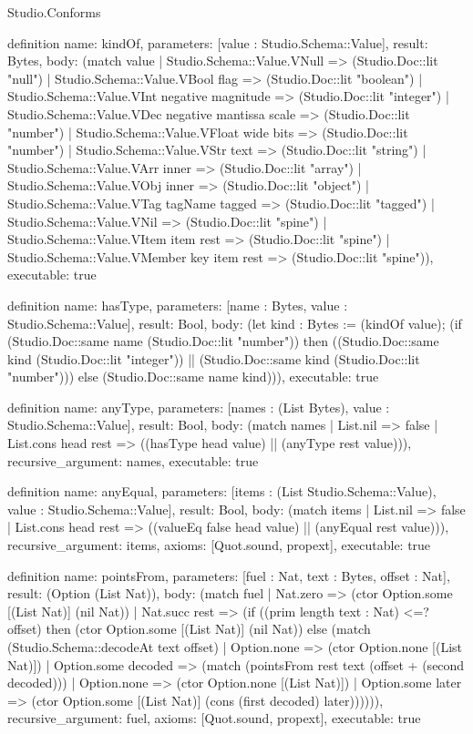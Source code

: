 \begin{lexlean}{Studio.Conforms}
\begin{semanticmodule}
definition{
  name: kindOf,
  parameters: [value : Studio.Schema::Value],
  result: Bytes,
  body: (match value
    | Studio.Schema::Value.VNull => (Studio.Doc::lit "null")
    | Studio.Schema::Value.VBool flag => (Studio.Doc::lit "boolean")
    | Studio.Schema::Value.VInt negative magnitude => (Studio.Doc::lit "integer")
    | Studio.Schema::Value.VDec negative mantissa scale => (Studio.Doc::lit "number")
    | Studio.Schema::Value.VFloat wide bits => (Studio.Doc::lit "number")
    | Studio.Schema::Value.VStr text => (Studio.Doc::lit "string")
    | Studio.Schema::Value.VArr inner => (Studio.Doc::lit "array")
    | Studio.Schema::Value.VObj inner => (Studio.Doc::lit "object")
    | Studio.Schema::Value.VTag tagName tagged => (Studio.Doc::lit "tagged")
    | Studio.Schema::Value.VNil => (Studio.Doc::lit "spine")
    | Studio.Schema::Value.VItem item rest => (Studio.Doc::lit "spine")
    | Studio.Schema::Value.VMember key item rest => (Studio.Doc::lit "spine")),
  executable: true
}

definition{
  name: hasType,
  parameters: [name : Bytes, value : Studio.Schema::Value],
  result: Bool,
  body: (let kind : Bytes := (kindOf value); (if (Studio.Doc::same name (Studio.Doc::lit "number")) then ((Studio.Doc::same kind (Studio.Doc::lit "integer")) || (Studio.Doc::same kind (Studio.Doc::lit "number"))) else (Studio.Doc::same name kind))),
  executable: true
}

definition{
  name: anyType,
  parameters: [names : (List Bytes), value : Studio.Schema::Value],
  result: Bool,
  body: (match names
    | List.nil => false
    | List.cons head rest => ((hasType head value) || (anyType rest value))),
  recursive_argument: names,
  executable: true
}

definition{
  name: anyEqual,
  parameters: [items : (List Studio.Schema::Value), value : Studio.Schema::Value],
  result: Bool,
  body: (match items
    | List.nil => false
    | List.cons head rest => ((valueEq false head value) || (anyEqual rest value))),
  recursive_argument: items,
  axioms: [Quot.sound, propext],
  executable: true
}

definition{
  name: pointsFrom,
  parameters: [fuel : Nat, text : Bytes, offset : Nat],
  result: (Option (List Nat)),
  body: (match fuel
    | Nat.zero => (ctor Option.some [(List Nat)] (nil Nat))
    | Nat.succ rest => (if ((prim length text : Nat) <=? offset) then (ctor Option.some [(List Nat)] (nil Nat)) else (match (Studio.Schema::decodeAt text offset)
      | Option.none => (ctor Option.none [(List Nat)])
      | Option.some decoded => (match (pointsFrom rest text (offset + (second decoded)))
        | Option.none => (ctor Option.none [(List Nat)])
        | Option.some later => (ctor Option.some [(List Nat)] (cons (first decoded) later)))))),
  recursive_argument: fuel,
  axioms: [Quot.sound, propext],
  executable: true
}


\end{semanticmodule}
\end{lexlean}
